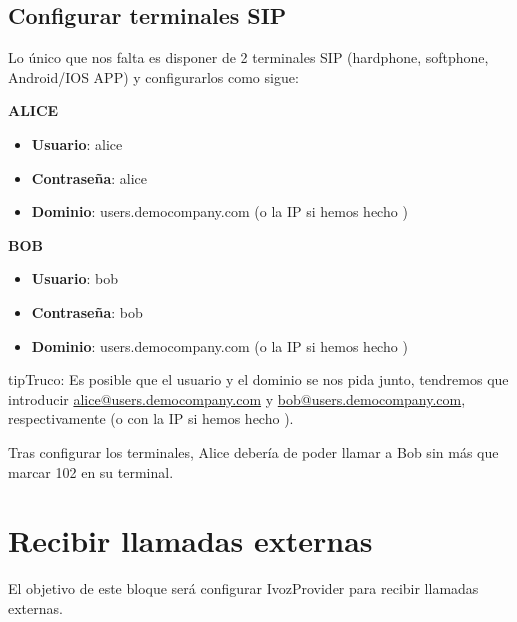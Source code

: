 \documentclass[letterpaper,10pt,spanish]{sphinxmanual}
\begin{document}
\section{Configurar terminales SIP}
\label{internal_calls/configure_sipuacs::doc}\label{internal_calls/configure_sipuacs:configurar-terminales-sip}
Lo único que nos falta es disponer de 2 terminales SIP (hardphone, softphone, Android/IOS APP) y configurarlos como sigue:

\textbf{ALICE}
\begin{itemize}
\item {} 
\textbf{Usuario}: alice

\item {} 
\textbf{Contraseña}: alice

\item {} 
\textbf{Dominio}: users.democompany.com (o la IP si hemos hecho {\hyperref[internal_calls/brand_portal:dnshack]{}})

\end{itemize}

\textbf{BOB}
\begin{itemize}
\item {} 
\textbf{Usuario}: bob

\item {} 
\textbf{Contraseña}: bob

\item {} 
\textbf{Dominio}: users.democompany.com (o la IP si hemos hecho {\hyperref[internal_calls/brand_portal:dnshack]{}})

\end{itemize}

\begin{notice}{tip}{Truco:}
Es posible que el usuario y el dominio se nos pida junto, tendremos que introducir \href{mailto:alice@users.democompany.com}{alice@users.democompany.com} y \href{mailto:bob@users.democompany.com}{bob@users.democompany.com}, respectivamente (o con la IP si hemos hecho {\hyperref[internal_calls/brand_portal:dnshack]{}}).
\end{notice}

Tras configurar los terminales, Alice debería de poder llamar a Bob sin más que marcar 102 en su terminal.


\chapter{Recibir llamadas externas}
\label{external_incoming_calls/index:recibir-llamadas-externas}\label{external_incoming_calls/index::doc}
El objetivo de este bloque será configurar IvozProvider para recibir llamadas externas.
\end{document}
